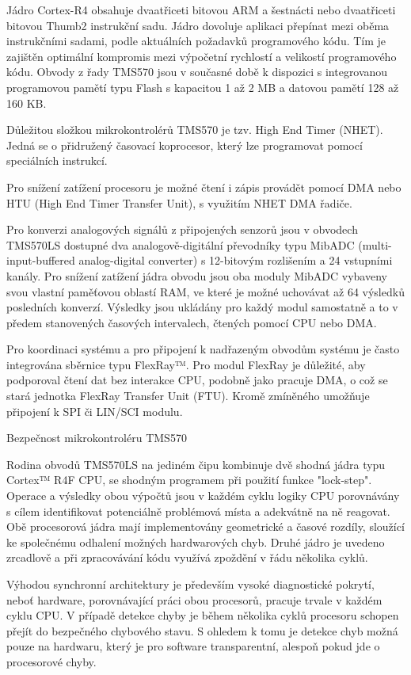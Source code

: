 Jádro Cortex-R4 obsahuje dvaatřiceti bitovou ARM a šestnácti nebo dvaatřiceti bitovou Thumb2 instrukční sadu.
Jádro dovoluje aplikaci přepínat mezi oběma instrukčními sadami, podle aktuálních požadavků programového kódu.
Tím je zajištěn optimální kompromis mezi výpočetní rychlostí a velikostí programového kódu.
Obvody z řady TMS570 jsou v současné době k dispozici s integrovanou programovou pamětí typu Flash s kapacitou 1 až 2 MB a datovou pamětí 128 až 160 KB.

Důležitou složkou mikrokontrolérů TMS570 je tzv. High End Timer (NHET).
Jedná se o přidružený časovací koprocesor, který lze programovat pomocí speciálních instrukcí.

Pro snížení zatížení procesoru je možné čtení i zápis provádět pomocí DMA nebo HTU (High End Timer Transfer Unit), s využitím NHET DMA řadiče.

Pro konverzi analogových signálů z připojených senzorů jsou v obvodech TMS570LS dostupné dva analogově-digitální převodníky typu MibADC (multi-input-buffered analog-digital converter) s 12-bitovým rozlišením a 24 vstupními kanály.
Pro snížení zatížení jádra obvodu jsou oba moduly MibADC vybaveny svou vlastní paměťovou oblastí RAM, ve které je možné uchovávat až 64 výsledků posledních konverzí.
Výsledky jsou ukládány pro každý modul samostatně a to v předem stanovených časových intervalech, čtených pomocí CPU nebo DMA.

Pro koordinaci systému a pro připojení k nadřazeným obvodům systému je často integrována sběrnice typu FlexRay™.
Pro modul FlexRay je důležité, aby podporoval čtení dat bez interakce CPU, podobně jako pracuje DMA, o což se stará jednotka FlexRay Transfer Unit (FTU).
Kromě zmíněného umožňuje připojení k SPI či LIN/SCI modulu.

\secc Bezpečnost mikrokontroléru TMS570

Rodina obvodů TMS570LS na jediném čipu kombinuje dvě shodná jádra typu Cortex™ R4F CPU, se shodným programem při použití funkce "lock-step".
Operace a výsledky obou výpočtů jsou v každém cyklu logiky CPU porovnávány s cílem identifikovat potenciálně problémová místa a adekvátně na ně reagovat.
Obě procesorová jádra mají implementovány geometrické a časové rozdíly, sloužící ke společnému odhalení možných hardwarových chyb.
Druhé jádro je uvedeno zrcadlově a při zpracovávání kódu využívá zpoždění v řádu několika cyklů.

Výhodou synchronní architektury je především vysoké diagnostické pokrytí, neboť hardware, porovnávající práci obou procesorů, pracuje trvale v každém cyklu CPU.
V případě detekce chyby je během několika cyklů procesoru schopen přejít do bezpečného chybového stavu.
S ohledem k tomu je detekce chyb možná pouze na hardwaru, který je pro software transparentní, alespoň pokud jde o procesorové chyby.

